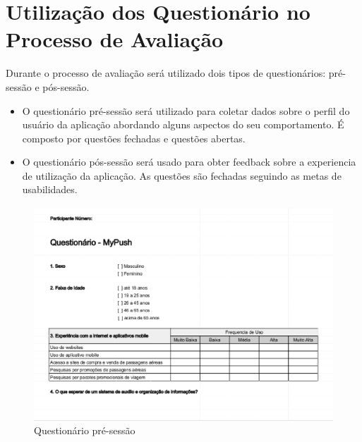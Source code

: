 \nocite{FILARDI_TRAINA_2008}

\section{Utilização dos Questionário no Processo de Avaliação}

Durante o processo de avaliação será utilizado dois tipos de questionários: pré-sessão e pós-sessão.
\begin{itemize}
	\item O questionário pré-sessão será utilizado para coletar dados sobre o perfil do usuário da aplicação abordando alguns aspectos do seu comportamento. É composto por questões fechadas e questões abertas.
	\item O questionário pós-sessão será usado para obter feedback sobre a experiencia de utilização da aplicação. As questões são fechadas seguindo as metas de usabilidades.
\end{itemize}

\begin{figure}[h]
	\centering
	\includegraphics[scale=0.5]{figuras/questionario_pre-sessao.eps}
	\caption{Questionário pré-sessão}
\end{figure}

